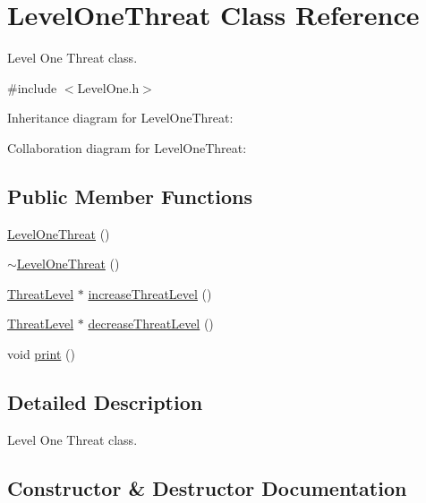 \hypertarget{classLevelOneThreat}{}\section{Level\+One\+Threat Class Reference}
\label{classLevelOneThreat}


Level One Threat class.  




{\ttfamily \#include $<$Level\+One.\+h$>$}



Inheritance diagram for Level\+One\+Threat\+:


Collaboration diagram for Level\+One\+Threat\+:
\subsection*{Public Member Functions}
\begin{DoxyCompactItemize}
\item 
\hyperlink{classLevelOneThreat_ae90b42ebcce70476ff405ccdcde0627e}{Level\+One\+Threat} ()
\item 
\hyperlink{classLevelOneThreat_a1c6e77c98473057eef8fe66f0e325fcf}{$\sim$\+Level\+One\+Threat} ()
\item 
\hyperlink{classThreatLevel}{Threat\+Level} $\ast$ \hyperlink{classLevelOneThreat_afc68f742f1101cb8d533d8cec21bac3f}{increase\+Threat\+Level} ()
\item 
\hyperlink{classThreatLevel}{Threat\+Level} $\ast$ \hyperlink{classLevelOneThreat_a9a2899ac02e075905671ea03374cd561}{decrease\+Threat\+Level} ()
\item 
void \hyperlink{classLevelOneThreat_a902492d8341a398b0209fb89e2aca68e}{print} ()
\end{DoxyCompactItemize}


\subsection{Detailed Description}
Level One Threat class. 

\subsection{Constructor \& Destructor Documentation}
\mbox{\label{classLevelOneThreat_ae90b42ebcce70476ff405ccdcde0627e}} 
